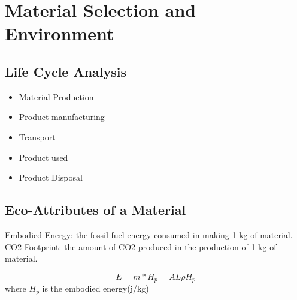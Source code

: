 \documentclass{article}
\begin{document}
       \section*{Material Selection and Environment} 
       \subsection*{Life Cycle Analysis}
       \begin{itemize}
           \item Material Production
           \item Product manufacturing
           \item Transport
           \item Product used
           \item Product Disposal
       \end{itemize}

       \subsection*{Eco-Attributes of a Material}
       Embodied Energy: the fossil-fuel energy consumed in making 1 kg of  material.
       CO2 Footprint: the amount of CO2 produced in the production of 1 kg of material.

       \begin{equation*}
            E = m * H_{p} = AL \rho H_{p}
       \end{equation*}
       where $H_{p}$ is the embodied energy(j/kg)





        
        
\end{document}
